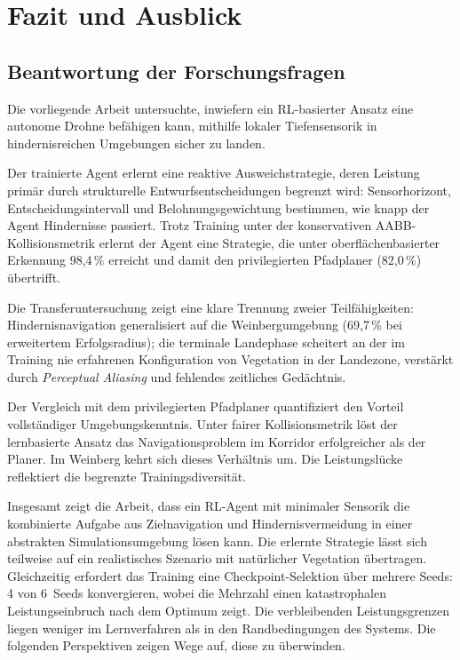 \chapter{Fazit und Ausblick}
\label{cha:Fazit und Ausblick}

\section{Beantwortung der Forschungsfragen}

Die vorliegende Arbeit untersuchte, inwiefern ein RL-basierter Ansatz eine
autonome Drohne befähigen kann, mithilfe lokaler Tiefensensorik in
hindernisreichen Umgebungen sicher zu landen.

Der trainierte Agent erlernt eine reaktive Ausweichstrategie, deren
Leistung primär durch strukturelle Entwurfsentscheidungen begrenzt wird:
Sensorhorizont, Entscheidungsintervall und Belohnungsgewichtung bestimmen,
wie knapp der Agent Hindernisse passiert. Trotz Training unter der konservativen
AABB-Kollisionsmetrik erlernt der Agent eine Strategie, die unter
oberflächenbasierter Erkennung 98,4\,\% erreicht und damit den
privilegierten Pfadplaner (82,0\,\%) übertrifft.

Die Transferuntersuchung zeigt eine klare Trennung zweier
Teilfähigkeiten: Hindernisnavigation generalisiert auf die
Weinbergumgebung (69,7\,\% bei erweitertem Erfolgsradius); die terminale
Landephase scheitert an der im Training nie erfahrenen Konfiguration von
Vegetation in der Landezone, verstärkt durch \textit{Perceptual Aliasing} und
fehlendes zeitliches Gedächtnis.

Der Vergleich mit dem privilegierten Pfadplaner quantifiziert den Vorteil
vollständiger Umgebungskenntnis. Unter fairer Kollisionsmetrik löst der
lernbasierte Ansatz das Navigationsproblem im Korridor erfolgreicher als
der Planer. Im Weinberg
kehrt sich dieses Verhältnis um. Die Leistungslücke reflektiert die
begrenzte Trainingsdiversität.

Insgesamt zeigt die Arbeit, dass ein RL-Agent mit minimaler
Sensorik die kombinierte Aufgabe aus Zielnavigation und
Hindernisvermeidung in einer abstrakten Simulationsumgebung lösen
kann. Die erlernte Strategie lässt sich teilweise auf ein
realistisches Szenario mit natürlicher Vegetation übertragen.
Gleichzeitig erfordert das Training eine Checkpoint-Selektion über
mehrere Seeds: 4 von 6~Seeds konvergieren, wobei die Mehrzahl einen
katastrophalen Leistungseinbruch nach dem Optimum zeigt. Die
verbleibenden Leistungsgrenzen liegen weniger im Lernverfahren als
in den Randbedingungen des Systems. Die folgenden Perspektiven
zeigen Wege auf, diese zu überwinden.

